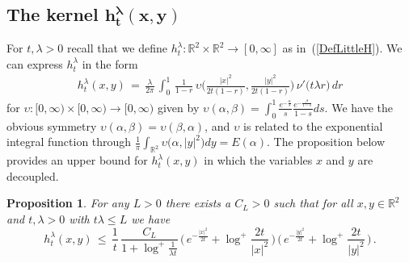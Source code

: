 \documentclass[10pt]{article}
\numberwithin{equation}{section}
\newtheorem{proposition}[theorem]{Proposition}
\theoremstyle{definition}
\newcommand{\R}{{\mathbb R}}
\begin{document}
\subsection{The kernel $\boldsymbol{h_{ t}^{\lambda}(x,y)}$}\label{SubSectHKern}
For $t,\lambda>0$ recall that we define $h_{t}^{\lambda}:\R^2\times \R^2\rightarrow [0,\infty]$ as in~(\ref{DefLittleH}).  We can express $h_{t}^{\lambda}$ in the form
\begin{align}\label{hKern}
h_{ t}^{\lambda}(x,y)\,=\,\frac{\lambda}{2\pi} \,\int_{0}^1 \,\frac{1}{1-r}\,\upsilon\bigg(\frac{|x|^2}{2t(1-r)}, \frac{|y|^2}{2t(1-r)} \bigg)\, \nu' \big(t\lambda  r\big)\,dr
\end{align}
for  $\upsilon:[0,\infty)\times [0,\infty)\rightarrow [0,\infty)     $ given by
$\upsilon(\alpha,\beta)= \int_0^1 \frac{e^{-\frac{\alpha}{ s}  }  }{ s }\frac{ e^{-\frac{\beta}{ 1-s} }  }{ 1-s  }ds$.   We have the obvious  symmetry  $\upsilon(\alpha,\beta)= \upsilon(\beta,\alpha)$, and $\upsilon$ is related to the exponential integral function through $\frac{1}{\pi}\int_{\R^2}\upsilon\big(\alpha,|y|^2\big)dy =E(\alpha) $. The proposition below provides an upper bound for $ h_{ t}^{\lambda}(x,y)$ in which the variables $x$ and $y$ are decoupled.
\begin{proposition} \label{hFunction}    For any $L>0$ there exists a  $C_L>0$ such that for all  $x,y\in \R^2$ and $t,\lambda >0$  with $ t\lambda \leq L  $ we have
    $$  h_{t}^{\lambda}(x,y)\,\leq \,\frac{1}{t}\,\frac{C_L}{ 1+\log^+ \frac{1}{\lambda t} }\,\bigg(\, e^{-\frac{|x|^2}{2t}}+\log^{+}\frac{2t}{|x|^2}  \,\bigg)\,\bigg(\, e^{-\frac{|y|^2}{2t}}+\log^{+}\frac{2t}{|y|^2} \, \bigg) \,.  $$

\end{proposition}
\end{document}
